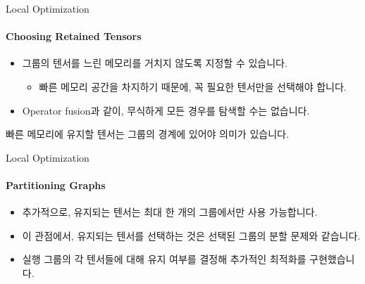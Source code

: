 \begin{frame}{Local Optimization}
\framesubtitle{Choosing Retained Tensors}

\begin{itemize}
  \item 그룹의 텐서를 느린 메모리를 거치지 않도록 지정할 수 있습니다.
  \begin{itemize}
    \item 빠른 메모리 공간을 차지하기 때문에, 꼭 필요한 텐서만을 선택해야 합니다.
  \end{itemize}
  \item Operator fusion과 같이, 무식하게 모든 경우를 탐색할 수는 없습니다.
\end{itemize}
\pause
\begin{figure}
  \centering
\end{figure}
\pause
\begin{tcolorbox}[title={제약 조건}]
  빠른 메모리에 유지할 텐서는 그룹의 경계에 있어야 의미가 있습니다.
\end{tcolorbox}
\end{frame}

\begin{frame}{Local Optimization}
\framesubtitle{Partitioning Graphs}

\begin{itemize}
  \item 추가적으로, 유지되는 텐서는 최대 한 개의 그룹에서만 사용 가능합니다.
  \item 이 관점에서, 유지되는 텐서를 선택하는 것은 선택된 그룹의 분할 문제와 같습니다.
\end{itemize}
\pause
\begin{figure}
  \centering
\end{figure}
\pause
\begin{itemize}
  \item 실행 그룹의 각 텐서들에 대해 유지 여부를 결정해 추가적인 최적화를 구현했습니다.
\end{itemize}
\end{frame}
